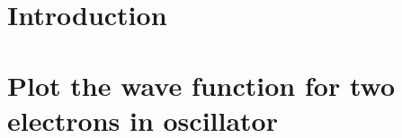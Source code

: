 \documentclass[a4paper,english]{article}
\begin{document}
\section{Introduction}


\section{Plot the wave function for two electrons in oscillator}

\end{document}
